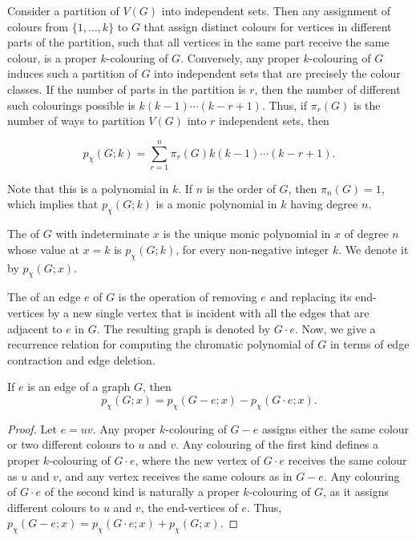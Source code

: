 Consider a partition of $V(G)$ into independent sets. Then any assignment of colours from $\{1, \ldots, k\}$ to $G$ that assign distinct colours for vertices in different parts of the partition, such that all vertices in the same part receive the same colour, is a proper $k$-colouring of $G$. Conversely, any proper $k$-colouring of $G$ induces such a partition of $G$ into independent sets that are precisely the colour classes. If the number of parts in the partition is $r$, then the number of different such colourings possible is $k(k - 1) \cdots (k - r + 1)$. Thus, if $\pi_r(G)$ is the number of ways to partition $V(G)$ into $r$ independent sets, then

\begin{equation*}
p_\chi(G; k) = \sum_{r = 1}^{n} \pi_r(G) k(k - 1) \cdots (k - r + 1).
\end{equation*}

Note that this is a polynomial in $k$. If $n$ is the order of $G$, then $\pi_n(G) = 1$, which implies that $p_\chi(G; k)$ is a monic polynomial in $k$ having degree $n$.

The  of $G$ with indeterminate $x$ is the unique monic polynomial in $x$ of degree $n$ whose value at $x = k$ is $p_\chi(G; k)$, for every non-negative integer $k$. We denote it by $p_\chi(G; x)$.

The  of an edge $e$ of $G$ is the operation of removing $e$ and replacing its end-vertices by a new single vertex that is incident with all the edges that are adjacent to $e$ in $G$. The resulting graph is denoted by $G \cdot e$. Now, we give a recurrence relation for computing the chromatic polynomial of $G$ in terms of edge contraction and edge deletion.

\begin{Theorem}\label{thm:ChromPolyRecurrence}
If $e$ is an edge of a graph $G$, then
\begin{equation*}
p_\chi(G; x) = p_\chi(G - e; x) - p_\chi(G \cdot e; x).
\end{equation*}
\end{Theorem}

\begin{proof}
Let $e = uv$. Any proper $k$-colouring of $G - e$ assigns either the same colour or two different colours to $u$ and $v$. Any colouring of the first kind defines a proper $k$-colouring of $G \cdot e$, where the new vertex of $G \cdot e$ receives the same colour as $u$ and $v$, and any vertex receives the same colours as in $G - e$. Any colouring of $G \cdot e$ of the second kind is naturally a proper $k$-colouring of $G$, as it assigns different colours to $u$ and $v$, the end-vertices of $e$. Thus, $p_\chi(G - e; x) = p_\chi(G \cdot e; x) + p_\chi(G; x)$.
\end{proof}


